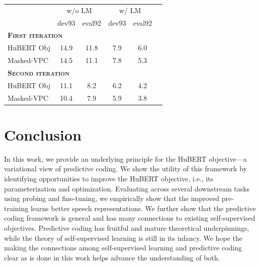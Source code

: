 \documentclass[11pt,a4paper]{article}
\begin{document}
\begin{table}[t]
\centering
{}
\label{tab:ctc-iter2}
\footnotesize
\begin{tabular}{lccccc}
  \toprule
  & \multicolumn{2}{c}{w/o LM} & \multicolumn{2}{c}{w/ LM}\\
  &dev93 &eval92 &dev93 &eval92\\[1pt]
  \midrule
  \multicolumn{3}{l}{\textbf{\textsc{First iteration}}} &\\[1pt]
  HuBERT Obj                  &14.9 &11.8 &7.9 &6.0\\
  Masked-VPC                &14.5 &11.1 &7.8 &5.3 \\
  \midrule
  \multicolumn{3}{l}{\textbf{\textsc{Second iteration}}} &\\[1pt]
  HuBERT Obj                &11.1 &8.2  &6.2 &4.2 \\
  Masked-VPC                &10.4 &7.9  &5.9 &3.8 \\
  \bottomrule
\end{tabular}
\end{table}



\section{Conclusion}

%
%
In this work, we provide an underlying principle for the HuBERT objective---a
variational view of predictive coding.
%
%
%
%
%
%
%
%
We show the utility of this framework by identifying opportunities to improve the HuBERT objective, i.e., its parameterization and optimization.
Evaluating across several downstream tasks using probing and fine-tuning, we empirically show that the improved pre-training learns better speech representations.
We further show that the predictive coding framework is general and has many connections to existing self-supervised objectives.
%
%
%
%
%
Predictive coding has fruitful and mature theoretical underpinnings, while the theory of self-supervised learning is still in its infancy.
We hope the making the connections among self-supervised learning and predictive coding clear as is done in this work helps advance the understanding of both.



%
%
\end{document}
